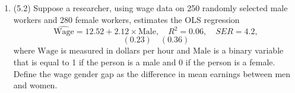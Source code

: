 \documentclass[11pt]{article}
\newcommand{\Var}{\text{Var}}
\newcommand{\Cov}{\text{Cov}}
\begin{document}
\begin{enumerate}
\begin{enumerate}
\begin{solution}
\begin{align*}
            &= \left(\frac{\sum (X_i - \bar X) (Y_i - \bar Y)}{\sum (X_i - \bar X)^2}\right)^2 \frac{\sum (X_i - \bar X)^2}{\sum (Y_i - \bar Y)^2}\\
            &= \frac{\hat\beta_1^2\sum (X_i - \bar X)^2}{\sum (Y_i - \bar Y)^2}\\
            &= \frac{\sum (\bar Y - \hat\beta_1 \bar X + \hat\beta_1 X_i - \bar Y)^2}{\sum (Y_i - \bar Y)^2}\\
            &= \frac{\sum (\hat\beta_0 + \hat\beta_1 X_i - \bar Y)^2}{\sum (Y_i - \bar Y)^2}\\
            &= \frac{\sum (\hat Y_i - \bar Y)^2}{\sum (Y_i - \bar Y)^2}\\
            &= R^2
        \end{align*}
    \end{solution}
        \item Show that $R^2$ from the regression $Y$ from $X$ is the same ass the $R^2$ from the regression $X$ from $Y.$
        \begin{solution}
            From part (i), we have that 
            \begin{align*}
                R^2_{Y \propto X} &= \frac{\hat\Cov(X,Y)^2}{\hat\Var(X)\hat\Var(Y)}\\
                &= \frac{\hat\Cov(Y,X)^2}{\hat\Var(Y)\hat\Var(X)}\\
                &= R^2_{X\propto Y}
            \end{align*}
        \end{solution}
        \item Show that $\hat\beta_1 = r_{XY}(\frac{\sigma_Y}{\sigma_X})$
        \begin{solution}
            From the work in part (i), we see that \[r^2 = \frac{\hat\beta_1^2 \sum (X_i - \bar X)^2}{\sum (Y_i - \bar Y)^2}  = \frac{\hat\beta_1 \frac{1}{n}\sum (X_i - \bar X)^2}{\frac{1}{n}\sum (Y_i - \bar Y)^2} = \hat\beta_1^2 \frac{\hat\sigma_X^2}{\hat\sigma_Y^2}\] Taking roots of both sides and rearranging yields the result. 
        \end{solution}
    \end{enumerate}
    \item (5.2)
    Suppose a researcher, using wage data on 250 randomly selected male workers and 280 female workers, estimates the OLS regression
$$\widehat{\text{Wage}} = 12.52 + 2.12 \times \text{Male}, \quad R^2 = 0.06, \quad SER = 4.2,$$
$$(0.23) \quad (0.36)$$
where $\text{Wage}$ is measured in dollars per hour and $\text{Male}$ is a binary variable that is equal to 1 if the person is a male and 0 if the person is a female. Define the wage gender gap as the difference in mean earnings between men and women.


\end{enumerate}
\end{document}

